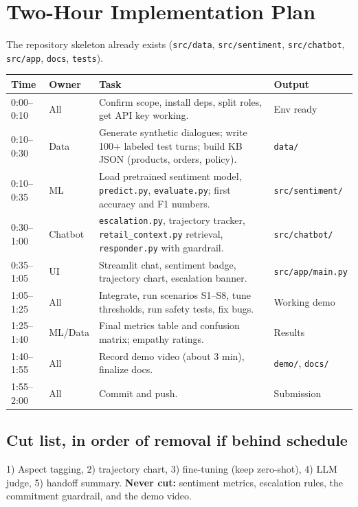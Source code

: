 \documentclass[11pt,a4paper]{article}
\begin{document}
\section{Two-Hour Implementation Plan}\label{sec:plan}
The repository skeleton already exists (\texttt{src/data}, \texttt{src/sentiment}, \texttt{src/chatbot}, \texttt{src/app}, \texttt{docs}, \texttt{tests}).

\begin{longtable}{@{}p{2.1cm}p{2.6cm}p{6.6cm}p{2.5cm}@{}}
\toprule
\textbf{Time} & \textbf{Owner} & \textbf{Task} & \textbf{Output}\\
\midrule
\endhead
0:00--0:10 & All & Confirm scope, install deps, split roles, get API key working. & Env ready\\
0:10--0:30 & Data & Generate synthetic dialogues; write 100+ labeled test turns; build KB JSON (products, orders, policy). & \texttt{data/}\\
0:10--0:35 & ML & Load pretrained sentiment model, \texttt{predict.py}, \texttt{evaluate.py}; first accuracy and F1 numbers. & \texttt{src/sentiment/}\\
0:30--1:00 & Chatbot & \texttt{escalation.py}, trajectory tracker, \texttt{retail\_context.py} retrieval, \texttt{responder.py} with guardrail. & \texttt{src/chatbot/}\\
0:35--1:05 & UI & Streamlit chat, sentiment badge, trajectory chart, escalation banner. & \texttt{src/app/main.py}\\
1:05--1:25 & All & Integrate, run scenarios S1--S8, tune thresholds, run safety tests, fix bugs. & Working demo\\
1:25--1:40 & ML/Data & Final metrics table and confusion matrix; empathy ratings. & Results\\
1:40--1:55 & All & Record demo video (about 3 min), finalize docs. & \texttt{demo/}, \texttt{docs/}\\
1:55--2:00 & All & Commit and push. & Submission\\
\bottomrule
\end{longtable}

\subsection{Cut list, in order of removal if behind schedule}
1) Aspect tagging, 2) trajectory chart, 3) fine-tuning (keep zero-shot), 4) LLM judge, 5) handoff summary. \textbf{Never cut:} sentiment metrics, escalation rules, the commitment guardrail, and the demo video.
\end{document}
